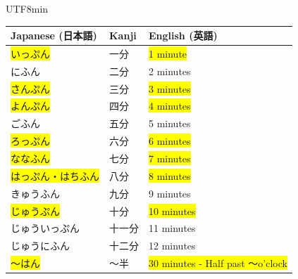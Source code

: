 \documentclass[11pt]{article}
\begin{document}
\begin{CJK}{UTF8}{min}
\begin{tabularx}{\textwidth}{X | X | X}
    \toprule
    \textbf{Japanese (日本語)} & \textbf{Kanji} & \textbf{English (英語)} \\
    \midrule
    \colorbox{yellow}{いっぷん} & 一分 & \colorbox{yellow}{1 minute} \\
    にふん & 二分 & 2 minutes \\
    \colorbox{yellow}{さんぷん} & 三分 & \colorbox{yellow}{3 minutes} \\
    \colorbox{yellow}{よんぷん} & 四分 & \colorbox{yellow}{4 minutes} \\
    ごふん & 五分 & 5 minutes \\
    \colorbox{yellow}{ろっぷん} & 六分 & \colorbox{yellow}{6 minutes} \\
    \colorbox{yellow}{ななふん} & 七分 & \colorbox{yellow}{7 minutes} \\
    \colorbox{yellow}{はっぷん・はちふん} & 八分 & \colorbox{yellow}{8 minutes} \\
    きゅうふん & 九分 & 9 minutes \\
    \colorbox{yellow}{じゅうぷん} & 十分 & \colorbox{yellow}{10 minutes} \\
    じゅういっぷん & 十一分 & 11 minutes \\
    じゅうにふん & 十二分 & 12 minutes \\
    \colorbox{yellow}{〜はん} & 〜半 & \colorbox{yellow}{30 minutes - Half past 〜o'clock} \\
    \bottomrule
\end{tabularx}


\end{CJK}
\end{document}
